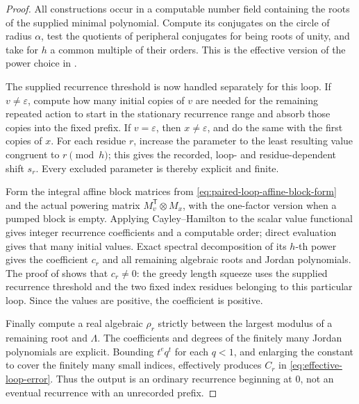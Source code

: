 \begin{proof}
  All constructions occur in a computable number field containing the roots
  of the supplied minimal polynomial. Compute its conjugates on the circle
  of radius \(\alpha\), test the quotients of peripheral conjugates for being
  roots of unity, and take for \(h\) a common multiple of their orders. This
  is the effective version of the power choice in
  .

  The supplied recurrence threshold is now handled separately for this
  loop. If \(v\ne\varepsilon\), compute how many initial copies of \(v\) are
  needed for the remaining repeated action to start in the stationary
  recurrence range and absorb those copies into the fixed prefix. If
  \(v=\varepsilon\), then \(x\ne\varepsilon\), and do the same with the
  first copies of \(x\). For each residue \(r\), increase the parameter to
  the least resulting value congruent to \(r\pmod h\); this gives the
  recorded, loop- and residue-dependent shift \(s_r\). Every excluded
  parameter is thereby explicit and finite.

  Form the integral affine block matrices from
  \eqref{eq:paired-loop-affine-block-form} and the actual powering matrix
  \(M_v^{\mathsf T}\otimes M_x\), with the one-factor version when a pumped
  block is empty. Applying Cayley--Hamilton to the scalar value functional
  gives integer recurrence coefficients and a computable order; direct
  evaluation gives that many initial values. Exact spectral decomposition
  of its \(h\)-th power gives the coefficient \(c_r\) and all remaining
  algebraic roots and Jordan polynomials. The proof of
   shows that \(c_r\ne0\): the
  greedy length squeeze uses the supplied recurrence threshold and the two
  fixed index residues belonging to this particular loop. Since the values
  are positive, the coefficient is positive.

  Finally compute a real algebraic \(\rho_r\) strictly between the largest
  modulus of a remaining root and \(\Lambda\). The coefficients and degrees
  of the finitely many Jordan polynomials are explicit. Bounding
  \(t^e q^t\) for each \(q<1\), and enlarging the constant to cover the
  finitely many small indices, effectively produces \(C_r\) in
  \eqref{eq:effective-loop-error}. Thus the output is an ordinary recurrence
  beginning at \(0\), not an eventual recurrence with an unrecorded prefix.
\end{proof}

